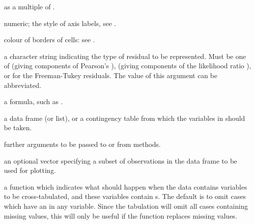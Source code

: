 \begin{Arguments}
\begin{ldescription}
as a multiple of .
\item[\code{las}] numeric; the style of axis labels, see .
\item[\code{border}] colour of borders of cells: see .
\item[\code{type}] a character string indicating the type of residual to be
represented.  Must be one of  (giving components of
Pearson's ),  (giving
components of the likelihood ratio ), or
 for the Freeman-Tukey residuals.  The value of this
argument can be abbreviated.
\item[\code{formula}] a formula, such as .
\item[\code{data}] a data frame (or list), or a contingency table from which
the variables in  should be taken.
\item[\code{...}] further arguments to be passed to or from methods.
\item[\code{subset}] an optional vector specifying a subset of observations
in the data frame to be used for plotting.
\item[\code{na.action}] a function which indicates what should happen
when the data contains variables to be cross-tabulated, and these
variables contain s.  The default is to omit cases which
have an  in any variable.  Since the tabulation will omit
all cases containing missing values, this will only be useful if the
 function replaces missing values.
\end{ldescription}
\end{Arguments}
%
